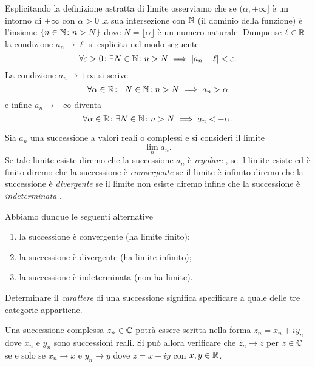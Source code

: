 Esplicitando la definizione astratta di limite osserviamo che se $(\alpha,+\infty]$
è un intorno di $+\infty$ con $\alpha>0$ la sua intersezione con ${\mathbb N}$ (il dominio della funzione)
è l'insieme ${\left\{ n\in {\mathbb N}\colon n> N \right\}}$ dove $N=\lfloor \alpha \rfloor$ è 
un numero naturale. Dunque se $\ell \in {\mathbb R}$ 
la condizione $a_n \to \ell$ si esplicita nel modo seguente:
\begin{equation}\label{eq:limite_successione_convergente}
\forall \varepsilon>0\colon \exists N\in {\mathbb N}\colon n>N\implies {\left|a_n-\ell\right|} < \varepsilon.  
\end{equation}
La condizione $a_n\to +\infty$ si scrive
\[
  \forall \alpha\in {\mathbb R} \colon \exists N\in {\mathbb N} \colon n>N \implies a_n > \alpha  
\]
e infine $a_n\to-\infty$ diventa
\[
  \forall \alpha\in {\mathbb R} \colon \exists N\in {\mathbb N} \colon n>N \implies a_n < -\alpha.    
\]

\begin{definition}
Sia $a_n$ una successione a valori reali o complessi
e si consideri il limite 
\[
  \lim_n a_n.  
\]
Se tale limite esiste diremo che la successione $a_n$ è 
\emph{regolare}%
%
,
%
se il limite esiste ed è finito diremo che la successione è 
\emph{convergente}%
%
%
se il limite è infinito diremo che la successione è 
\emph{divergente}%
%
%
se il limite non esiste diremo infine che la successione è
\emph{indeterminata}%
%
%
.

Abbiamo dunque le seguenti alternative
\begin{enumerate}
 \item la successione è convergente (ha limite finito);
 \item la successione è divergente (ha limite infinito);
 \item la successione è indeterminata (non ha limite).
\end{enumerate}
Determinare il \emph{carattere}
%
%
%
di una successione
significa specificare a quale delle tre categorie appartiene.
\end{definition}

\begin{exercise}
Una successione complessa $z_n\in {\mathbb C}$ potrà essere scritta
nella forma $z_n = x_n + i y_n$ dove $x_n$ e $y_n$ sono successioni
reali. Si può allora verificare che $z_n\to z$ per $z\in {\mathbb C}$ se e solo se
$x_n\to x$ e $y_n\to y$ dove $z=x+ iy$ con $x,y\in {\mathbb R}$.
\end{exercise}

